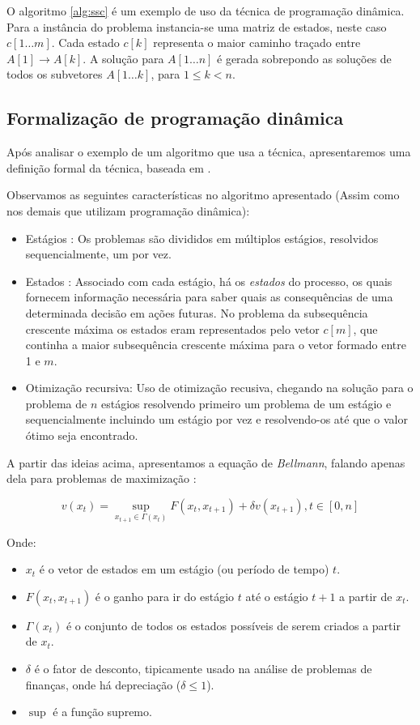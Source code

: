 O algoritmo \ref{alg:ssc} é um exemplo de uso da técnica de programação dinâmica. Para a instância do problema instancia-se uma matriz de estados, neste caso $c[ 1 \ldots m]$. Cada estado $c[k]$ representa o maior caminho traçado entre $A[1] \rightarrow A[k]$. A solução para $A[1 \ldots n]$ é gerada sobrepondo as soluções de todos os subvetores $A[1 \ldots k]$, para $1 \leq k < n$.

\subsection{Formalização de programação dinâmica}

Após analisar o exemplo de um algoritmo que usa a técnica, apresentaremos uma definição formal da técnica, baseada em \cite{Bradley}.

Observamos as seguintes características no algoritmo apresentado (Assim como nos demais que utilizam programação dinâmica):

\begin{itemize}
\item Estágios : Os problemas são divididos em múltiplos estágios, resolvidos sequencialmente, um por vez.
\item Estados : Associado com cada estágio, há os \textit{estados} do processo, os quais fornecem informação necessária para saber quais as consequências de uma determinada decisão em ações futuras. No problema da subsequência crescente máxima os estados eram representados pelo vetor $c[m]$, que continha a maior subsequência crescente máxima para o vetor formado entre 1 e $m$.
\item Otimização recursiva: Uso de otimização recusiva, chegando na solução para o problema de $n$ estágios resolvendo primeiro um problema de um estágio e sequencialmente incluindo um estágio por vez e resolvendo-os até que o valor ótimo seja encontrado.
\end{itemize}

A partir das ideias acima, apresentamos a equação de \textit{Bellmann}, falando apenas dela para problemas de maximização \cite{laibson}:

\begin{equation}
\label{equ:bellmann}
v(x_t) = \sup_{x_{t+1} \in \Gamma(x_t)} { F(x_t,x_{t+1}) + \delta v (x_{t+1}) }, t \in [0,n]
\end{equation}

Onde:

\begin{itemize}
\item $x_t$ é o vetor de estados em um estágio (ou período de tempo) $t$.
\item $F(x_t, x_{t+1})$ é o ganho para ir do estágio $t$ até o estágio $t+1$ a partir de $x_t$.
\item $\Gamma(x_t)$ é o conjunto de todos os estados possíveis de serem criados a partir de $x_t$.
\item $\delta$ é o fator de desconto, tipicamente usado na análise de problemas de finanças, onde há depreciação ($\delta \leq 1$).
\item $\sup{}{}$ é a função supremo.
\end{itemize}

